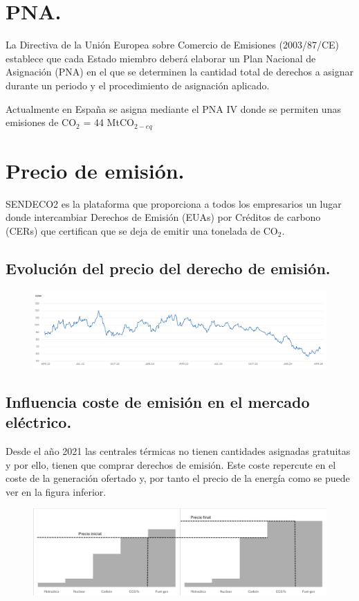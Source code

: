 \section{PNA.}
	La Directiva de la Unión Europea sobre Comercio de Emisiones (2003/87/CE) establece que cada Estado
	miembro deberá elaborar un Plan Nacional de Asignación (PNA) en el que se determinen la cantidad total de
	derechos a asignar durante un periodo y el procedimiento de asignación aplicado.
	
	
	Actualmente en España se asigna mediante el PNA IV donde se permiten unas emisiones de CO$_2$ = 44 MtCO$_{2-eq}$
\section{Precio de emisión.}
SENDECO2 es la plataforma que proporciona a todos los empresarios un lugar donde intercambiar Derechos de Emisión (EUAs) por Créditos de carbono (CERs) que certifican que se deja de emitir una tonelada de CO$_2$.
\subsection{Evolución del precio del derecho de emisión.}
\begin{figure}[H]
	\centering
	\includegraphics[width=1\linewidth]{res/tema2/precioEUA}
	\label{fig:t-emisiones}
\end{figure}
\newpage
\subsection{Influencia coste de emisión en el mercado eléctrico.}
Desde el año 2021 las centrales térmicas no tienen cantidades asignadas gratuitas y por ello, tienen que comprar derechos de emisión. Este coste repercute en el coste de la generación ofertado y, por tanto el precio de la energía como se puede ver en la figura inferior.
\begin{figure}[H]
	\centering
	\includegraphics[width=1.2\linewidth]{res/tema2/variacionPrecio}
	\label{fig:variacionprecio}
\end{figure}

